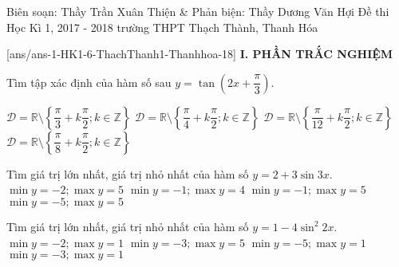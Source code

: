 
	\begin{name}
{Biên soạn: Thầy Trần Xuân Thiện \& Phản biện: Thầy Dương Văn Hợi}
		{Đề thi Học Kì 1, 2017 - 2018 trường THPT Thạch Thành, Thanh Hóa}
	\end{name}
	\setcounter{ex}{0}\setcounter{bt}{0}
	[ans/ans-1-HK1-6-ThachThanh1-Thanhhoa-18]
\noindent\textbf{I. PHẦN TRẮC NGHIỆM}
\begin{ex}%
Tìm tập xác định của hàm số sau $y = \tan \left(2x+\dfrac{\pi}{3}\right)$.

	\choice
	{$\mathscr{D} = \mathbb{R} \setminus \left\{\dfrac{\pi}{3}+k\dfrac{\pi}{2};k\in \mathbb{Z}\right\}$}
	{$\mathscr{D} = \mathbb{R} \setminus \left\{\dfrac{\pi}{4}+k\dfrac{\pi}{2};k\in \mathbb{Z}\right\}$}
	{\True $\mathscr{D} = \mathbb{R} \setminus \left\{\dfrac{\pi}{12}+k\dfrac{\pi}{2};k\in \mathbb{Z}\right\}$}
	{$\mathscr{D} = \mathbb{R} \setminus \left\{\dfrac{\pi}{8}+k\dfrac{\pi}{2};k\in \mathbb{Z}\right\}$}
\end{ex}

\begin{ex}%
Tìm giá trị lớn nhất, giá trị nhỏ nhất của hàm số $y = 2+3\sin 3x$.
	\choice
	{$\min y = -2; \max y = 5$}
{$\min y = -1; \max y = 4$}
{\True $\min y = -1; \max y = 5$}
{$\min y = -5; \max y = 5$}
\end{ex}

\begin{ex}%
Tìm giá trị lớn nhất, giá trị nhỏ nhất của hàm số $y = 1-4 \sin^2 2x$.
	\choice
{$\min y = -2; \max y = 1$}
{$\min y = -3; \max y = 5$}
{$\min y = -5; \max y = 1$}
{\True $\min y = -3; \max y = 1$}
\end{ex}

